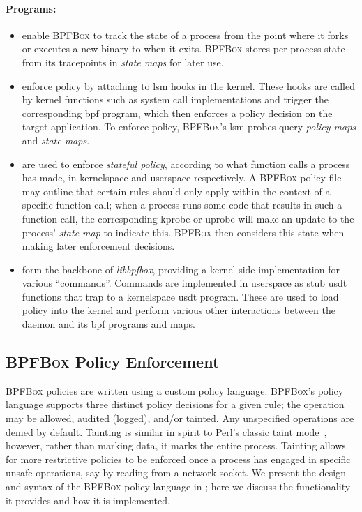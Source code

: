 \documentclass[
  fontsize=12pt,
  titlepage=firstiscover,
  paper=letter,
oneside,
  cleardoublepage=plain,
  parskip=half-,
  DIV=10,
  parindent,
  appendixprefix,
  chapterprefix,
  listof=totoc,
]{scrbook}
\newcommand{\bpfbox}{\textsc{BPFBox}}
\begin{document}
\paragraph*{Programs:}
\begin{itemize}
  \item \textbf{} enable \bpfbox{} to track the state of a process from the
  point where it forks or executes a new binary to when it exits. \bpfbox{} stores
  per-process state from its tracepoints in \textit{state maps} for later use.

  \item \textbf{} enforce policy by attaching to \gls{lsm} hooks in the
  kernel. These hooks are called by kernel functions such as system call implementations
  and trigger the corresponding \gls{bpf} program, which then enforces a policy decision on the
  target application. To enforce policy, \bpfbox{}'s \gls{lsm} probes query \textit{policy
  maps} and \textit{state maps}.

  \item \textbf{} are used to enforce \textit{stateful policy},
  according to what function calls a process has made, in kernelspace and userspace
  respectively. A \bpfbox{} policy file may outline that certain rules should only apply
  within the context of a specific function call; when a process runs some code that
  results in such a function call, the corresponding kprobe or uprobe will make an update
  to the process' \textit{state map} to indicate this. \bpfbox{} then considers this state
  when making later enforcement decisions.

  \item \textbf{} form the backbone of \textit{libbpfbox},
  providing a kernel-side implementation for various \enquote{commands}. Commands are
  implemented in userspace as stub \gls{usdt} functions that trap to a kernelspace
  \gls{usdt} program. These are used to load policy into the kernel and perform various
  other interactions between the daemon and its \gls{bpf} programs and maps.
\end{itemize}

\subsection{\bpfbox{} Policy Enforcement}\label{ss:bpfbox-enforcement}

\bpfbox{} policies are written using a custom policy language.  \bpfbox{}'s policy
language supports three distinct policy decisions for a given rule; the operation may be
allowed, audited (logged), and/or tainted.  Any unspecified operations are denied by
default. Tainting is similar in spirit to Perl's classic taint mode~\cite{hurst2004_perl},
however, rather than marking data, it marks the entire process.  Tainting allows for more
restrictive policies to be enforced once a process has engaged in specific unsafe
operations, say by reading from a network socket.  We present the design and syntax of the
\bpfbox{} policy language in ; here we discuss the functionality
it provides and how it is implemented.
\end{document}
